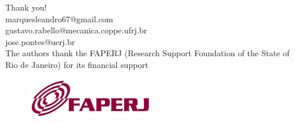 \begin{frame}
 \centering
 \vspace{-1cm}
 \Huge Thank you!\\
 \vspace{0.5cm}
 \small marquesleandro67@gmail.com\\
 \small gustavo.rabello@mecanica.coppe.ufrj.br\\
 \small jose.pontes@uerj.br\\
 \vspace{1.0cm}
 \small The authors thank the FAPERJ (Research Support Foundation of the State of Rio de Janeiro)
        for its financial support

 \vspace{-0.2cm}
 \begin{figure}
  \centering
  \includegraphics[scale=0.4]{images/faperj.jpg}\\
 \end{figure}
\end{frame}





